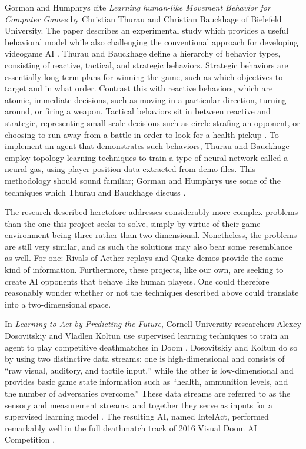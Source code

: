 Gorman and Humphrys cite {\it Learning human-like Movement Behavior for Computer Games} by Christian Thurau and Christian Bauckhage of Bielefeld University. The paper describes an experimental study which provides a useful behavioral model while also challenging the conventional approach for developing videogame AI \cite{Thurau:2004}. Thurau and Bauckhage define a hierarchy of behavior types, consisting of reactive, tactical, and strategic behaviors. Strategic behaviors are essentially long-term plans for winning the game, such as which objectives to target and in what order. Contrast this with reactive behaviors, which are atomic, immediate decisions, such as moving in a particular direction, turning around, or firing a weapon. Tactical behaviors sit in between reactive and strategic, representing small-scale decisions such as circle-strafing an opponent, or choosing to run away from a battle in order to look for a health pickup \cite{Gorman:2006}. To implement an agent that demonstrates such behaviors, Thurau and Bauckhage employ topology learning techniques to train a type of neural network called a neural gas, using player position data extracted from demo files. This methodology should sound familiar; Gorman and Humphrys use some of the techniques which Thurau and Bauckhage discuss \cite{Thurau:2004}.

The research described heretofore addresses considerably more complex problems than the one this project seeks to solve, simply by virtue of their game environment being three rather than two-dimensional. Nonetheless, the problems are still very similar, and as such the solutions may also bear some resemblance as well. For one: Rivals of Aether replays and Quake demos provide the same kind of information. Furthermore, these projects, like our own, are seeking to create AI opponents that behave like human players. One could therefore reasonably wonder whether or not the techniques described above could translate into a two-dimensional space.

In {\it Learning to Act by Predicting the Future}, Cornell University researchers Alexey Dosovitskiy and Vladlen Koltun use supervised learning techniques to train an agent to play competitive deathmatches in Doom \cite{VDComp:2016}. Dosovitskiy and Koltun do so by using two distinctive data streams: one is high-dimensional and consists of ``raw visual, auditory, and tactile input,'' while the other is low-dimensional and provides basic game state information such as ``health, ammunition levels, and the number of adversaries overcome.'' These data streams are referred to as the sensory and measurement streams, and together they serve as inputs for a supervised learning model \cite{Dosovitskiy:2016}. The resulting AI, named IntelAct, performed remarkably well in the full deathmatch track of 2016 Visual Doom AI Competition \cite{VDComp:2016}.

